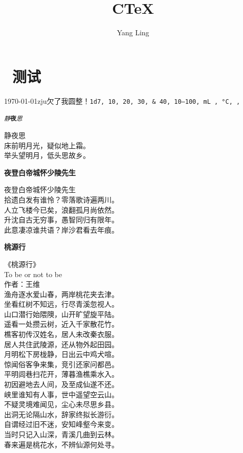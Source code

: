 \documentclass[cs4size,sub3section,UTF8,nofonts,SlantFont,fancyhdr,hyperref,fntef]{ctexart}\usepackage[]{graphicx}\usepackage[]{color}
\author{Yang Ling}
\title{CTeX}
\begin{document}
\section{\CTeX~\XeLaTeX 测试}
\today zju欠了我\money 圆整！\tt\num{1d7}, \numlist{10;20;30;40}, \numrange{10}{100}, \si{\milli\liter, \degreeCelsius}, \textcelsius, \texteuro

\tt\textsl{静}\textbf{夜}\textit{思}
\begin{center}
静夜思\\
床前明月光，疑似地上霜。\\
举头望明月，低头思故乡。
\end{center}

\yalan\textbf{夜登白帝城怀少陵先生}
\begin{center}
夜登白帝城怀少陵先生\\
拾遗白发有谁怜？零落歌诗遍两川。\\
人立飞楼今已矣，浪翻孤月尚依然。\\
升沈自古无穷事，愚智同归有限年。\\
此意凄凉谁共语？岸沙君看去年痕。
\end{center}

\sf\textbf{桃源行}
\begin{center}
《桃源行》\\
To be or not to be\\
作者：王维\\
渔舟逐水爱山春，两岸桃花夹去津。\\
坐看红树不知远，行尽青溪忽视人。\\
山口潜行始隈隩，山开旷望旋平陆。\\
遥看一处攒云树，近入千家散花竹。\\
樵客初传汉姓名，居人未改秦衣服。\\
居人共住武陵源，还从物外起田园。\\
月明松下房栊静，日出云中鸡犬喧。\\
惊闻俗客争来集，竞引还家问都邑。\\
平明闾巷扫花开，薄暮渔樵乘水入。\\
初因避地去人间，及至成仙遂不还。\\
峡里谁知有人事，世中遥望空云山。\\
不疑灵境难闻见，尘心未尽思乡县。\\
出洞无论隔山水，辞家终拟长游衍。\\
自谓经过旧不迷，安知峰壑今来变。\\
当时只记入山深，青溪几曲到云林。\\
春来遍是桃花水，不辨仙源何处寻。
\end{center}
\end{document}
